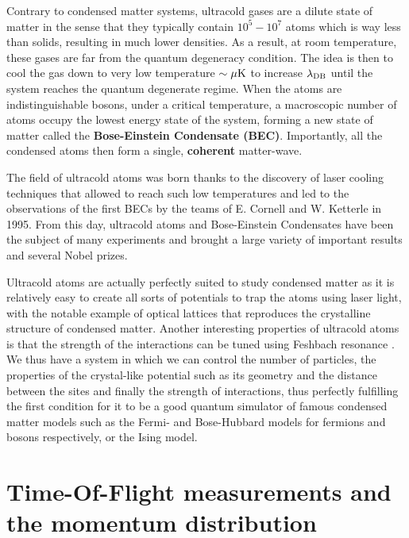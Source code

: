Contrary to condensed matter systems, ultracold gases are a dilute state of matter in the sense that they typically contain $10^5-10^7$ atoms which is way less than solids, resulting in much lower densities. As a result, at room temperature, these gases are far from the quantum degeneracy condition. The idea is then to cool the gas down to very low temperature $\sim \mu \rm{K}$ to increase $\lambda_{\rm{DB}}$ until the system reaches the quantum degenerate regime. When the atoms are indistinguishable  bosons, under a critical temperature, a macroscopic number of atoms occupy the lowest energy state of the system, forming a new state of matter called the \textbf{Bose-Einstein Condensate (BEC)}. Importantly, all the condensed atoms then form a single, \textbf{coherent} matter-wave. 

The field of ultracold atoms was born thanks to the discovery of laser cooling techniques \cite{chu1985three,dalibard1989laser,phillips1982laser} that allowed to reach such low temperatures and led to the observations of the first BECs by the teams of E. Cornell \cite{anderson1995observation} and W. Ketterle \cite{davis1995bose} in 1995. From this day, ultracold atoms and Bose-Einstein Condensates have been the subject of many experiments and brought a large variety of important results and several Nobel prizes.

Ultracold atoms are actually perfectly suited to study condensed matter as it is relatively easy to create all sorts of potentials to trap the atoms using laser light, with the notable example of optical lattices \cite{bloch2005ultracold} that reproduces the crystalline structure of condensed matter. Another interesting properties of ultracold atoms is that the strength of the interactions can be tuned using Feshbach resonance \cite{feshbach1958unified,chin2010feshbach}. We thus have a system in which we can control the number of particles, the properties of the crystal-like potential such as its geometry and the distance between the sites and finally the strength of interactions, thus perfectly fulfilling the first condition for it to be a good quantum simulator of famous condensed matter models such as the Fermi- and Bose-Hubbard models for fermions and bosons respectively, or the Ising model. 

\section*{Time-Of-Flight measurements and the momentum distribution}

